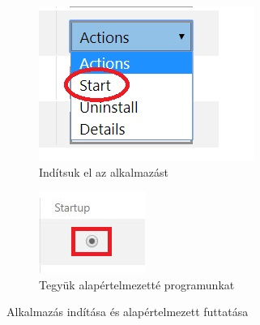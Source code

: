 \documentclass[a4paper,12pt]{report}
\begin{document}
\begin{figure}[h!]
    \centering
    \begin{subfigure}[b]{0.4\linewidth}
        \includegraphics[width=\linewidth]{images/startapp.jpg}
        \caption{Indítsuk el az alkalmazást}
    \end{subfigure}
    \begin{subfigure}[b]{0.4\linewidth}
        \includegraphics[width=\linewidth]{images/startupapp.jpg}
        \caption{Tegyük alapértelmezetté programunkat}
    \end{subfigure}
    \caption{Alkalmazás indítása és alapértelmezett futtatása}
    \label{fig:StartupApp}
\end{figure}
\end{document}
